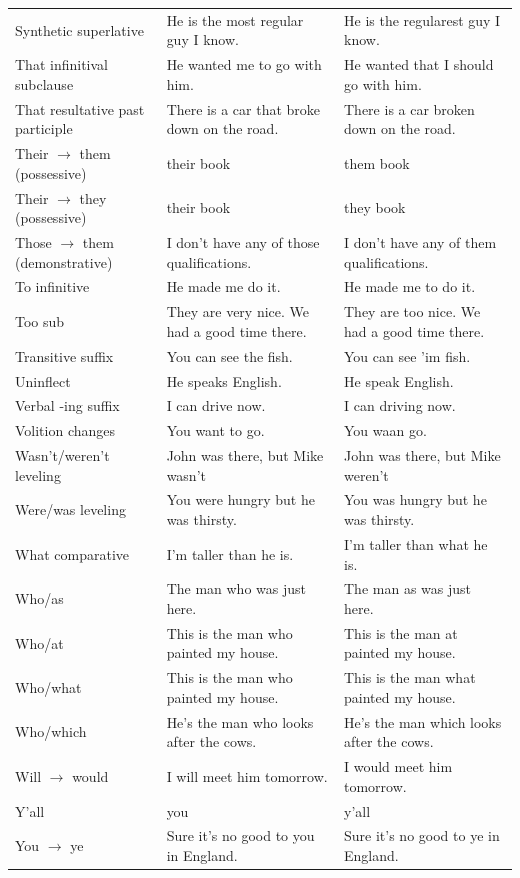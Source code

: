 \begin{longtable}{
  >{\raggedright\arraybackslash}p{3.2cm}
  >{\raggedright\arraybackslash}p{4.8cm}
  >{\raggedright\arraybackslash}p{4.8cm}
}
Synthetic superlative & He is the most regular guy I know. & He is the regularest guy I know. \\
That infinitival subclause & He wanted me to go with him. & He wanted that I should go with him. \\
That resultative past participle & There is a car that broke down on the road. & There is a car broken down on the road. \\
Their $\rightarrow$ them (possessive) & their book & them book \\
Their $\rightarrow$ they (possessive) & their book & they book \\
Those $\rightarrow$ them (demonstrative) & I don't have any of those qualifications. & I don't have any of them qualifications. \\
To infinitive & He made me do it. & He made me to do it. \\
Too sub & They are very nice. We had a good time there. & They are too nice. We had a good time there. \\
Transitive suffix & You can see the fish. & You can see 'im fish. \\
Uninflect & He speaks English. & He speak English. \\
Verbal -ing suffix & I can drive now. & I can driving now. \\
Volition changes & You want to go. & You waan go. \\
Wasn't/weren't leveling & John was there, but Mike wasn't & John was there, but Mike weren't \\
Were/was leveling & You were hungry but he was thirsty. & You was hungry but he was thirsty. \\
What comparative & I'm taller than he is. & I'm taller than what he is. \\
Who/as & The man who was just here. & The man as was just here. \\
Who/at & This is the man who painted my house. & This is the man at painted my house. \\
Who/what & This is the man who painted my house. & This is the man what painted my house. \\
Who/which & He's the man who looks after the cows. & He's the man which looks after the cows. \\
Will $\rightarrow$ would & I will meet him tomorrow. & I would meet him tomorrow. \\
Y'all & you & y'all \\
You $\rightarrow$ ye & Sure it's no good to you in England. & Sure it's no good to ye in England. \\

\end{longtable}
